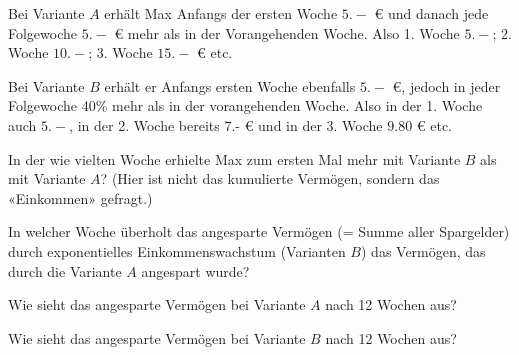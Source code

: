Bei Variante $A$ erhält Max Anfangs der ersten Woche  $5.-$ \euro{} und danach jede Folgewoche $5.-$ \euro{} mehr als in der Vorangehenden Woche. Also 1. Woche $5.-$; 2. Woche $10.-$; 3. Woche $15.-$ \euro{} etc.

Bei Variante $B$ erhält er Anfangs ersten Woche ebenfalls $5.-$
\euro{}, jedoch in jeder Folgewoche 40\% mehr als in der vorangehenden
Woche. Also in der 1. Woche auch $5.-$, in der 2. Woche bereits 7.-
\euro{} und in der 3. Woche $9.80$ \euro{} etc.

\begin{bbwAufgabenBlock}
\item In der wie vielten  Woche erhielte Max zum ersten Mal mehr mit Variante $B$ als mit Variante $A$? (Hier ist nicht das kumulierte Vermögen, sondern das «Einkommen» gefragt.)

\item In welcher Woche überholt das angesparte Vermögen (= Summe aller
  Spargelder) durch exponentielles Einkommenswachstum (Varianten $B$) das Vermögen, das durch die Variante $A$ angespart wurde?

\item Wie sieht das angesparte Vermögen bei Variante $A$ nach 12 Wochen aus?

\item Wie sieht das angesparte Vermögen bei Variante $B$ nach 12 Wochen aus?
\end{bbwAufgabenBlock}
\platzFuerBerechnungenBisEndeSeite{}



\newpage
